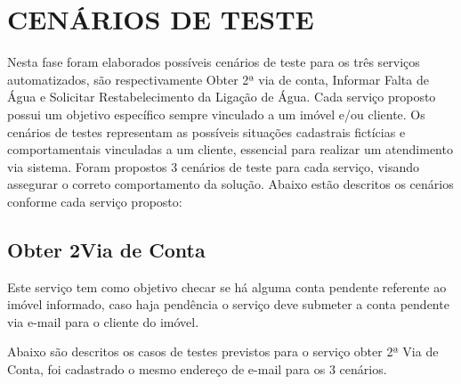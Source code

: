 \section{\textbf{\uppercase{Cenários de Teste}}}
Nesta fase foram elaborados possíveis cenários de teste para os três serviços automatizados, são respectivamente Obter 2ª via de conta, Informar Falta de Água e Solicitar Restabelecimento da Ligação de Água. Cada serviço proposto possui um objetivo específico sempre vinculado a um imóvel e/ou cliente.
Os cenários de testes representam as possíveis situações cadastrais fictícias e comportamentais vinculadas a um cliente, essencial para realizar um atendimento via sistema. Foram propostos 3 cenários de teste para cada serviço, visando assegurar o correto comportamento da solução. Abaixo estão descritos os cenários conforme cada serviço proposto:

\subsection{\textbf{Obter 2\textordfeminine \space Via de Conta}}
Este serviço tem como objetivo checar se há alguma conta pendente referente ao imóvel informado, caso haja pendência o serviço deve submeter a conta pendente via e-mail para o cliente do imóvel. 

Abaixo são descritos os casos de testes previstos para o serviço obter 2ª Via de Conta, foi cadastrado o mesmo endereço de e-mail para os 3 cenários.

